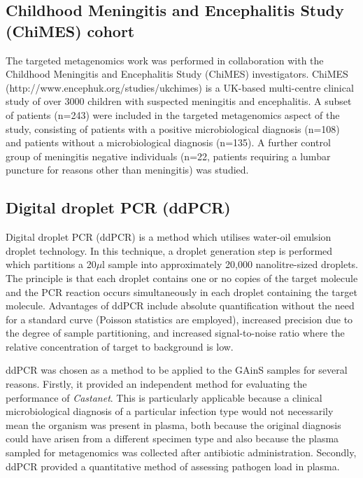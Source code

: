 \subsection{Childhood Meningitis and Encephalitis Study (ChiMES) cohort} 
The targeted metagenomics work was performed in collaboration with the Childhood Meningitis and Encephalitis Study (ChiMES) investigators. ChiMES (http://www.encephuk.org/studies/ukchimes) is a UK-based multi-centre clinical study of over 3000 children with suspected meningitis and encephalitis. A subset of patients (n=243) were included in the targeted metagenomics aspect of the study, consisting of patients with a positive microbiological diagnosis (n=108) and patients without a microbiological diagnosis (n=135). A further control group of meningitis negative individuals (n=22, patients requiring a lumbar puncture for reasons other than meningitis) was studied.

\subsection{Digital droplet PCR (ddPCR)}
Digital droplet PCR (ddPCR) is a method which utilises water-oil emulsion droplet technology. In this technique, a droplet generation step is performed which partitions a 20$\mu$l sample into approximately 20,000 nanolitre-sized droplets. The principle is that each droplet contains one or no copies of the target molecule and the PCR reaction occurs simultaneously in each droplet containing the target molecule. Advantages of ddPCR include absolute quantification without the need for a standard curve (Poisson statistics are employed), increased precision due to the degree of sample partitioning, and increased signal-to-noise ratio where the relative concentration of target to background is low. 

ddPCR was chosen as a method to be applied to the GAinS samples for several reasons. Firstly, it provided an independent method for evaluating the performance of \textit{Castanet}. This is particularly applicable because a clinical microbiological diagnosis of a particular infection type would not necessarily mean the organism was present in plasma, both because the original diagnosis could have arisen from a different specimen type and also because the plasma sampled for metagenomics was collected after antibiotic administration. Secondly, ddPCR provided a quantitative method of assessing pathogen load in plasma.

